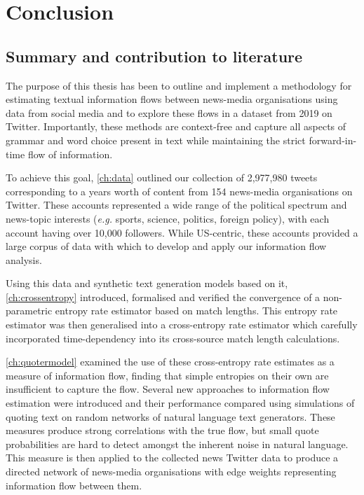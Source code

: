 \chapter{Conclusion}\label{ch:conclusion}

\section{Summary and contribution to literature}


The purpose of this thesis has been to outline and implement a methodology for estimating textual information flows between news-media organisations using data from social media and to explore these flows in a dataset from 2019 on Twitter. Importantly, these methods are context-free and capture all aspects of grammar and word choice present in text while maintaining the strict forward-in-time flow of information.

To achieve this goal, \autoref{ch:data} outlined our collection of 2,977,980 tweets corresponding to a years worth of content from 154 news-media organisations on Twitter. These accounts represented a wide range of the political spectrum and news-topic interests (\emph{e.g.} sports, science, politics, foreign policy), with each account having over 10,000 followers. While US-centric, these accounts provided a large corpus of data with which to develop and apply our information flow analysis.

Using this data and synthetic text generation models based on it, \autoref{ch:crossentropy} introduced, formalised and verified the convergence of a non-parametric entropy rate estimator based on match lengths. This entropy rate estimator was then generalised into a cross-entropy rate estimator which carefully incorporated time-dependency into its cross-source match length calculations. 

\autoref{ch:quotermodel} examined the use of these cross-entropy rate estimates as a measure of information flow, finding that simple entropies on their own are insufficient to capture the flow. Several new approaches to information flow estimation were introduced and their performance compared using simulations of quoting text on random networks of natural language text generators. These measures produce strong correlations with the true flow, but small quote probabilities are hard to detect amongst the inherent noise in natural language. This measure is then applied to the collected news Twitter data to produce a directed network of news-media organisations with edge weights representing information flow between them. 

